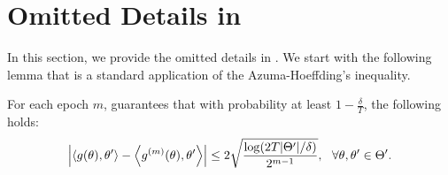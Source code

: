 \section{Omitted Details in }\label{app: contextual}
In this section, we provide the omitted details in .
We start with the following lemma that is a standard application of the Azuma-Hoeffding's inequality.
\begin{lemma}\label{lem:prop_two}
    For each epoch $m$,  guarantees that with probability at least $1-\frac{\delta}{T}$, the following holds:
    \begin{align*}
        \left|\left\langle {g(\theta),\theta'} \right\rangle - \left\langle {g^{(m)}(\theta),\theta'} \right\rangle\right| \leq 2\sqrt{\frac{\log(2T|\Theta'|/\delta)}{2^{m-1}}},~~\forall \theta,\theta'\in\Theta'.
    \end{align*}
\end{lemma}

